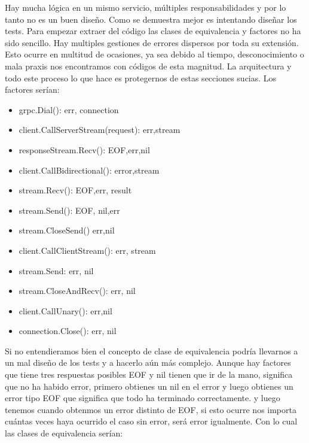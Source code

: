 Hay mucha lógica en un mismo servicio, múltiples responsabilidades y por lo tanto no es un buen diseño. Como se demuestra mejor es intentando diseñar los tests. Para empezar extraer del código las clases de equivalencia y factores no ha sido sencillo. Hay multiples gestiones de errores dispersos por toda su extensión. Esto ocurre en multitud de ocasiones, ya sea debido al tiempo, desconocimiento o mala praxis nos encontramos con códigos de esta magnitud. La arquitectura y todo este proceso lo que hace es protegernos de estas secciones sucias. Los factores serían:

\begin{itemize}
    \item grpc.Dial(): err, connection
    \item client.CallServerStream(request): err,stream
    \item responseStream.Recv(): EOF,err,nil
    \item client.CallBidirectional(): error,stream
    \item stream.Recv(): EOF,err, result
    \item stream.Send(): EOF, nil,err
    \item stream.CloseSend() err,nil
    \item client.CallClientStream(): err, stream
    \item stream.Send: err, nil
    \item stream.CloseAndRecv(): err, nil
    \item client.CallUnary(): err,nil
    \item connection.Close(): err, nil
\end{itemize}

Si no entendieramos bien el concepto de clase de equivalencia podría llevarnos a un mal diseño de los tests y a hacerlo aún más complejo. Aunque hay factores que tiene tres respuestas posibles EOF y nil tienen que ir de la mano, significa que no ha habido error, primero obtienes un nil en el error y luego obtienes un error tipo EOF que significa que todo ha terminado correctamente. y luego tenemos cuando obtenmos un error distinto de EOF, si esto ocurre nos importa cuántas veces haya ocurrido el caso sin error, será error igualmente. Con lo cual las clases de equivalencia serían:

